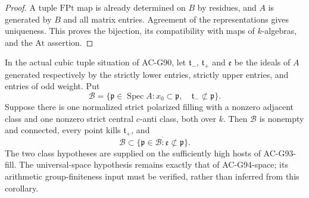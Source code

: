 \begin{proof}
A tuple \(\mathrm{FPt}\) map is already determined on
\(B\) by residues, and \(A\) is generated by \(B\)
and all matrix entries.
Agreement of the representations gives uniqueness.
This proves the bijection, its compatibility with maps
of \(k\)-algebras, and the \(\mathrm{At}\) assertion.
\end{proof}

\begin{corollary}
\label{AC-G95-lower-locus}
In the actual cubic tuple situation of AC-G90, let
\(\mathfrak t_-\), \(\mathfrak t_+\) and \(\mathfrak e\)
be the ideals of \(A\) generated respectively by the
strictly lower entries, strictly upper entries, and
entries of odd weight.  Put
\[
 \mathcal B=\{\mathfrak p\in\operatorname{Spec}A:
       x_0\subset\mathfrak p,\quad
       \mathfrak t_-\not\subset\mathfrak p\}.
 \tag{G95.9}
\]
Suppose there is one normalized strict polarized filling
with a nonzero adjacent class and one nonzero strict
central \(c\)-anti class, both over \(k\).
Then \(\mathcal B\) is nonempty and connected, every
point kills \(\mathfrak t_+\), and
\[
 \mathcal B\subset
 \overline{\{\mathfrak p\in\mathcal B:
                      \mathfrak e\not\subset\mathfrak p\}} .
 \tag{G95.10}
\]
The two class hypotheses are supplied on the sufficiently
high hosts of AC-G93-fill.
The universal-space hypothesis remains exactly that of
AC-G94-space; its arithmetic group-finiteness input must
be verified, rather than inferred from this corollary.
\end{corollary}

